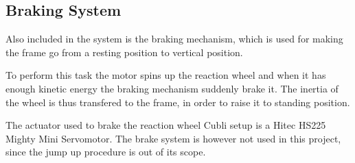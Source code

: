 \subsection{Braking System}
Also included in the system is the braking mechanism, which is used for making the frame go from a resting position to vertical position.

To perform this task the motor spins up the reaction wheel and when it has enough kinetic energy the braking mechanism suddenly brake it. The inertia of the wheel is thus transfered to the frame, in order to raise it to standing position.

The actuator used to brake the reaction wheel Cubli setup is a Hitec HS225 Mighty Mini Servomotor. The brake system is however not used in this project, since the jump up procedure is out of its scope.

